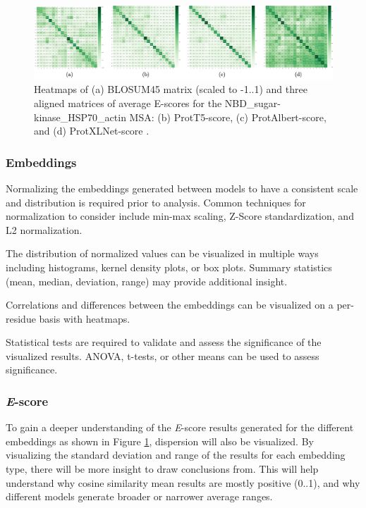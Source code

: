 \documentclass[
	letterpaper, %
	10pt, %
]{journalArticle}
\begin{document}
\begin{figure} %
	\includegraphics[width=\linewidth]{Figures/Escorematrices.jpeg}
	\caption{Heatmaps of (a) BLOSUM45 matrix (scaled to -1..1) and three aligned matrices of average E-scores for the NBD\_sugar-kinase\_HSP70\_actin MSA: (b) ProtT5-score, (c) ProtAlbert-score, and (d) ProtXLNet-score \autocite{Ashrafzadeh:2023}.}
	\label{fig:escoreheatmap}
\end{figure}

\subsubsection{Embeddings}
Normalizing the embeddings generated between models to have a consistent scale and distribution is required prior to analysis. Common techniques for normalization to consider include min-max scaling, Z-Score standardization, and L2 normalization.

The distribution of normalized values can be visualized in multiple ways including histograms, kernel density plots, or box plots. Summary statistics (mean, median, deviation, range) may provide additional insight.

Correlations and differences between the embeddings can be visualized on a per-residue basis with heatmaps.

Statistical tests are required to validate and assess the significance of the visualized results. ANOVA, t-tests, or other means can be used to assess significance.

\subsubsection{\textit{E}-score}

To gain a deeper understanding of the \textit{E}-score results generated for the different embeddings as shown in Figure \ref{fig:escoreheatmap}, dispersion will also be visualized. By visualizing the standard deviation and range of the results for each embedding type, there will be more insight to draw conclusions from. This will help understand why cosine similarity mean results are mostly positive (0..1), and why different models generate broader or narrower average ranges.
\end{document}
